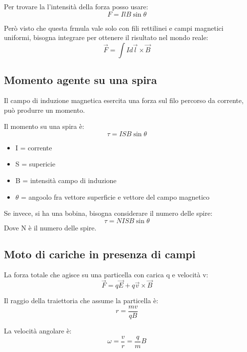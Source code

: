 Per trovare la l'intensità della forza posso usare:
\begin{equation}
    F = IlB\sin\theta
\end{equation}

Però visto che questa frmula vale solo con fili rettilinei e campi magnetici
uniformi, bisogna integrare per ottenere il risultato nel mondo reale:
\begin{equation}
    \vec{F} = \int{Id\vec{l}\times\vec{B}}
\end{equation}

\subsection{Momento agente su una spira}
Il campo di induzione magnetica esercita una forza sul filo percorso
da corrente, può produrre un momento.

Il momento su una spira è:
\begin{equation}
    \tau = ISB\sin\theta
\end{equation}
\begin{itemize}
    \item I = corrente
    \item S = supericie
    \item B = intensità campo di induzione
    \item $\theta$ = angoolo fra vettore superficie e vettore del campo magnetico
\end{itemize}

Se invece, si ha una bobina, bisogna considerare il numero delle spire:
\begin{equation}
    \tau = NISB\sin\theta
\end{equation}
Dove N è il numero delle spire.

\subsection{Moto di cariche in presenza di campi}
La forza totale che agisce su una particella con carica q
e velocità v:
\begin{equation}
    \vec{F} = q\vec{E} + q\vec{v}\times\vec{B}
\end{equation}

Il raggio della traiettoria che assume la particella è:
\begin{equation}
    r = \frac{mv}{qB}
\end{equation}

La velocità angolare è:
\begin{equation}
    \omega = \frac{v}{r}=\frac{q}{m}B
\end{equation}
